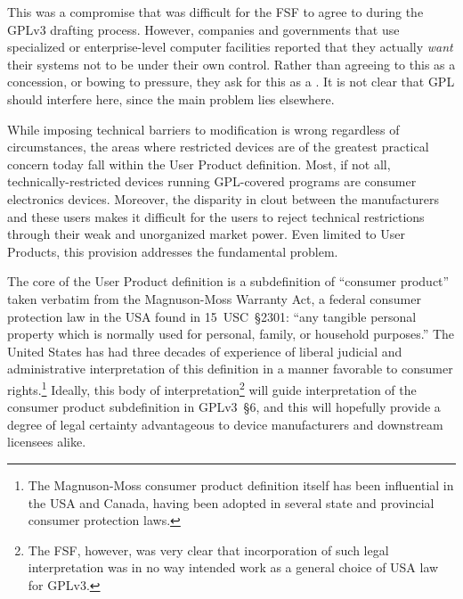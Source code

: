 This was a compromise that was difficult for the FSF to agree to during the
GPLv3 drafting process.  However, companies and governments that use
specialized or enterprise-level computer facilities reported that they
actually \textit{want} their systems not to be under their own control.
Rather than agreeing to this as a concession, or bowing to pressure, they ask
for this as a .  It is not clear that GPL should interfere
here, since the main problem lies elsewhere.

While imposing technical barriers to modification is wrong regardless of
circumstances, the areas where restricted devices are of the greatest
practical concern today fall within the User Product definition.  Most, if
not all, technically-restricted devices running GPL-covered programs are
consumer electronics devices.  Moreover, the disparity in clout between the
manufacturers and these users makes it difficult for the users to reject
technical restrictions through their weak and unorganized market power.  Even
limited to User Products, this provision addresses the fundamental problem.


The core of the User Product definition is a subdefinition of ``consumer
product'' taken verbatim from the Magnuson-Moss Warranty Act, a federal
consumer protection law in the USA found in 15~USC~\S2301: ``any tangible
personal property which is normally used for personal, family, or household
purposes.''  The United States has had three decades of experience of liberal
judicial and administrative interpretation of this definition in a manner
favorable to consumer rights.\footnote{The Magnuson-Moss consumer product
  definition itself has been influential in the USA and Canada, having been
  adopted in several state and provincial consumer protection laws.}
Ideally, this body of interpretation\footnote{The FSF, however, was very
  clear that incorporation of such legal interpretation was in no way
  intended work as a general choice of USA law for GPLv3.} will guide
interpretation of the consumer product subdefinition in GPLv3~\S6, and this
will hopefully provide a degree of legal certainty advantageous to device
manufacturers and downstream licensees alike.

